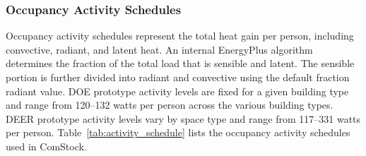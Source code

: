 
\subsubsection{Occupancy Activity Schedules}
Occupancy activity schedules represent the total heat gain per person, including convective, radiant, and latent heat. An internal EnergyPlus algorithm determines the fraction of the total load that is sensible and latent. The sensible portion is further divided into radiant and convective using the default fraction radiant value. DOE prototype activity levels are fixed for a given building type and range from 120--132 watts per person across the various building types. DEER prototype activity levels vary by space type and range from 117--331 watts per person. Table~\ref{tab:activity_schedule} lists the occupancy activity schedules used in ComStock.

%
\pagebreak

%
%
%
%
%
%
%

